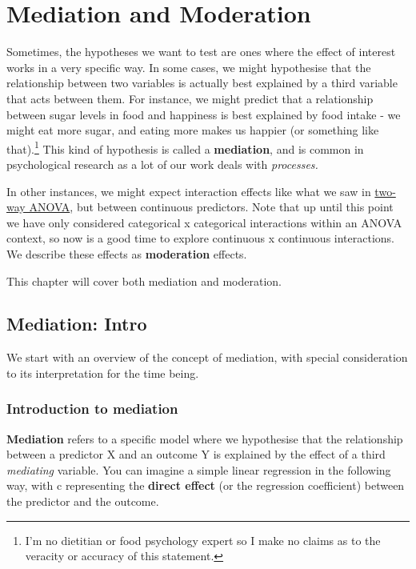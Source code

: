 \documentclass[
]{book}
\begin{document}
\chapter{Mediation and Moderation}\label{mediation-and-moderation}

Sometimes, the hypotheses we want to test are ones where the effect of interest works in a very specific way. In some cases, we might hypothesise that the relationship between two variables is actually best explained by a third variable that acts between them. For instance, we might predict that a relationship between sugar levels in food and happiness is best explained by food intake - we might eat more sugar, and eating more makes us happier (or something like that).\footnote{I'm no dietitian or food psychology expert so I make no claims as to the veracity or accuracy of this statement.} This kind of hypothesis is called a \textbf{mediation}, and is common in psychological research as a lot of our work deals with \emph{processes.}

In other instances, we might expect interaction effects like what we saw in \hyperref[interactions]{two-way ANOVA}, but between continuous predictors. Note that up until this point we have only considered categorical x categorical interactions within an ANOVA context, so now is a good time to explore continuous x continuous interactions. We describe these effects as \textbf{moderation} effects.

This chapter will cover both mediation and moderation.

\section{Mediation: Intro}\label{mediation-intro}

We start with an overview of the concept of mediation, with special consideration to its interpretation for the time being.

\subsection{Introduction to mediation}\label{introduction-to-mediation}

\textbf{Mediation} refers to a specific model where we hypothesise that the relationship between a predictor X and an outcome Y is explained by the effect of a third \emph{mediating} variable. You can imagine a simple linear regression in the following way, with c representing the \textbf{direct effect} (or the regression coefficient) between the predictor and the outcome.
\end{document}
